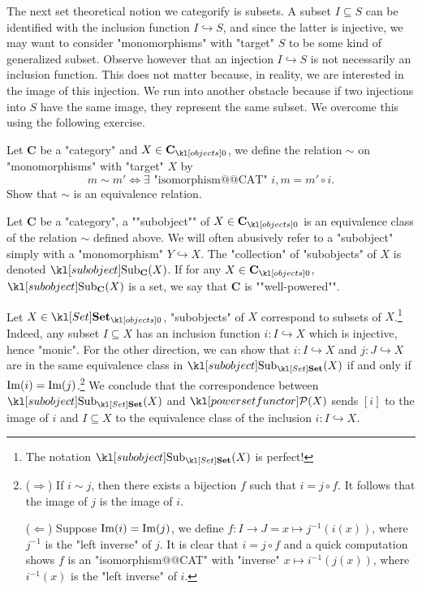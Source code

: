 \documentclass[main.tex]{subfiles}
\begin{document}
The next set theoretical notion we categorify is subsets. A subset $I \subseteq S$ can be identified with the inclusion function $I \hookrightarrow S$, and since the latter is injective, we may want to consider "monomorphisms" with "target" $S$ to be some kind of generalized subset. Observe however that an injection $I \hookrightarrow S$ is not necessarily an inclusion function. This does not matter because, in reality, we are interested in the image of this injection. We run into another obstacle because if two injections into $S$ have the same image, they represent the same subset. We overcome this using the following exercise.
\begin{exer}\label{exer:duality:equivsubobj}
	Let $\mathbf{C}$ be a "category" and $X \in \obj{\mathbf{C}}$, we define the relation $\sim$ on "monomorphisms" with "target" $X$ by \[m \sim m' \Leftrightarrow \exists \text{ "isomorphism@@CAT" } i,  m = m' \circ i.\]
	Show that $\sim$ is an equivalence relation.
\end{exer}
\begin{defn}[Subobject]
	\AP Let $\mathbf{C}$ be a "category", a ""subobject"" of $X \in \obj{\mathbf{C}}$ is an equivalence class of the relation $\sim$ defined above. We will often abusively refer to a "subobject" simply with a "monomorphism" $Y \hookrightarrow X$. The "collection" of "subobjects" of $X$ is denoted $\Sub_{\mathbf{C}}(X)$. \AP If for any $X \in \obj{\mathbf{C}}$, $\Sub_{\mathbf{C}}(X)$ is a set, we say that $\mathbf{C}$ is ""well-powered"".
\end{defn}
\begin{exmp}[$\catSet$]
	Let $X \in \obj{\catSet}$, "subobjects" of $X$ correspond to subsets of $X$.\footnote{The notation $\Sub_{\catSet}(X)$ is perfect!} Indeed, any subset $I \subseteq X$ has an inclusion function $i: I \hookrightarrow X$ which is injective, hence "monic". For the other direction, we can show that $i:I \hookrightarrow X$ and $j: J \hookrightarrow X$ are in the same equivalence class in $\Sub_{\catSet}(X)$ if and only if $\operatorname{Im}(i) = \operatorname{Im}(j)$.\footnote{($\Rightarrow$) If $i \sim j$, then there exists a bijection $f$ such that $i = j \circ f$. It follows that the image of $j$ is the image of $i$.
	
	($\Leftarrow$) Suppose $\operatorname{Im}(i)=\operatorname{Im}(j)$, we define $f:I \rightarrow J = x \mapsto j^{-1}(i(x))$, where $j^{-1}$ is the "left inverse" of $j$. It is clear that $i = j \circ f$ and a quick computation shows $f$ is an "isomorphism@@CAT" with "inverse" $x\mapsto i^{-1}(j(x))$, where $i^{-1}(x)$ is the "left inverse" of $i$.} We conclude that the correspondence between $\Sub_{\catSet}(X)$ and $\mPcov(X)$ sends $[i]$ to the image of $i$ and $I\subseteq X$ to the equivalence class of the inclusion $i: I \hookrightarrow X$.
\end{exmp}
\end{document}
